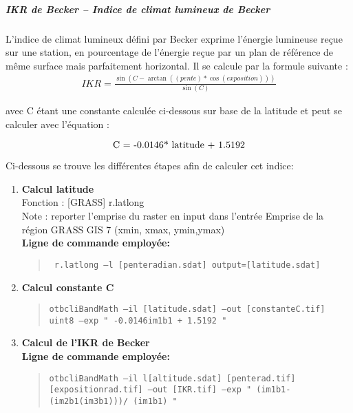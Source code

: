 \subparagraph{IKR de Becker – Indice de climat lumineux de Becker }


L’indice de climat lumineux défini par Becker exprime l’énergie lumineuse reçue sur une station, en pourcentage de l’énergie reçue par un plan de référence de même surface mais parfaitement horizontal. Il se calcule par la formule suivante : 
\begin{align*}
IKR=\frac{\sin(C-\arctan((pente)*\cos(exposition)))}{\sin(C)}
\end{align*}

avec C étant une constante calculée ci-dessous sur base de la latitude et peut se calculer avec l'équation :

\begin{equation}

$C = -0.0146* latitude + 1.5192$ 

\end{equation}

Ci-dessous se trouve les différentes étapes afin de calculer cet indice:
\begin{enumerate}
   

        \item  \textbf{Calcul latitude}\\
Fonction : [GRASS] r.latlong \\
Note : reporter l’emprise du raster en input  dans l’entrée Emprise de la région GRASS GIS 7 (xmin, xmax, ymin,ymax)\\
\textbf{Ligne de commande employée:} 
\begin{quote}
\texttt{ r.latlong --l [pente\textunderscore radian.sdat] output=[latitude.sdat]}
\end{quote}
 
 

        \item \textbf {Calcul constante C}
\begin{quote}
 \texttt{otbcli\textunderscore BandMath --il [latitude.sdat] --out [constante\textunderscore C.tif] \; uint8 \; --exp " -0.0146\times im1b1 + 1.5192 "} 
   \end{quote}
  
        \item \textbf {Calcul de l’IKR de Becker} \\


\textbf{Ligne de commande employée:}
\begin{quote}
 \texttt{otbcli\textunderscore BandMath --il l[altitude.sdat] [pente\textunderscore rad.tif]
 [exposition\textunderscore rad.tif] --out [IKR.tif] --exp  " \sin(im1b1-\atan(im2b1\times \cos(im3b1)))/ \sin(im1b1) " } \\
   
   \end{quote}

\end{enumerate}

